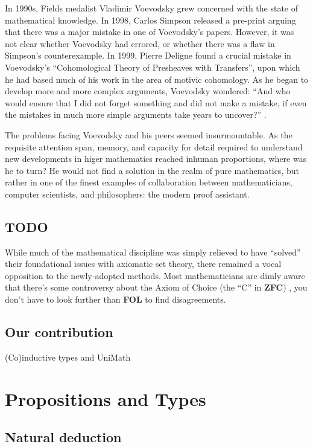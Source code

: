 \documentclass[12pt,twoside,draft]{reedthesis}
\makeatletter
\newcommand{\TODO}[1]{\marginpar{\footnotesize\color{TODO}todo: #1}}
\let\oldindex\index
\renewcommand{\index}[1]{\oldindex{#1}\marginpar{\footnotesize\color{index}index: #1}}
\newcommand{\indeX}[1]{\oldindex{#1}}
\newcommand{\abbreviation}[1]{\textbf{#1}\indeX{#1@\textbf{#1}}} %
\makeatother
\begin{document}
In 1990s, Fields medalist Vladimir Voevodsky grew concerned with the state
of mathematical knowledge. In 1998, Carlos Simpson released a pre-print arguing
that there was a major mistake in one of Voevodsky's papers. However, it was not
clear whether Voevodsky had errored, or whether there was a flaw in Simpson's
counterexample. In 1999, Pierre Deligne found a crucial mistake in Voevodsky's
``Cohomological Theory of Presheaves with Transfers'', upon which he had based
much of his work in the area of motivic cohomology. As he began to develop more
and more complex arguments, Voevodsky wondered: ``And who would ensure that I
did not forget something and did not make a mistake, if even the mistakes in
much more simple arguments take years to uncover?'' \cite{voevodsky-ias}. 

The problems facing Voevodsky and his peers seemed insurmountable.
As the requisite attention span, memory, and capacity for detail required to
understand new developments in higer mathematics reached inhuman proportions,
where was he to turn? He would not find a solution in the realm of pure
mathematics, but rather in one of the finest examples of collaboration between
mathematicians, computer scientists, and philosophers: the modern proof
assistant. \TODO{reword}

\section*{TODO}

While much of the mathematical discipline was simply relieved to have ``solved''
their foundational issues with axiomatic set theory, there remained a vocal
opposition to the newly-adopted methods. Most mathematicians are dimly aware
that there's some controversy about the Axiom of Choice (the ``C'' in
\abbreviation{ZFC}) \cite{martin-lof-100-years}, you don't have to look further
than \abbreviation{FOL} to find disagreements.

\section*{Our contribution}

(Co)inductive types and UniMath

\chapter{Propositions and Types}
\label{chap:propositions-and-types}

\section{Natural deduction}
\label{sec:natural-deduction}
\end{document}
